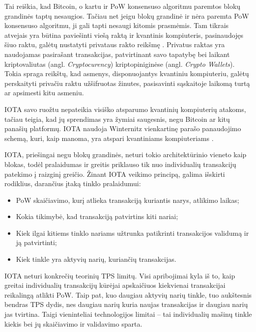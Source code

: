 Tai reiškia, kad Bitcoin, o kartu ir PoW konsensuso algoritmu paremtos blokų grandinės taptų nesaugios. Tačiau net jeigu blokų grandinė ir nėra paremta PoW konsensuso algoritmu, ji gali tapti nesaugi kitomis prasmėmis. Tam tikrais atvejais yra būtina paviešinti viešą raktą ir kvantinis kompiuteris, pasinaudojęs šiuo raktu, galėtų nustatyti privataus rakto reikšmę \cite{aggarwal2017quantum}. Privatus raktas yra naudojamas pasirašant transakcijas, patvirtinant savo tapatybę bei laikant kriptovaliutas (angl. \textit{Cryptocurency}) kriptopiniginėse (angl. \textit{Crypto Wallets}). Tokia spraga reikštų, kad asmenys, disponuojantys kvantiniu kompiuteriu, galėtų perskaityti privačiu raktu užšifruotas žinutes, pasisavinti sąskaitoje laikomą turtą ar apsimesti kitu asmeniu.

IOTA savo ruožtu nepateikia visiško atsparumo kvantinių kompiuterių atakoms, tačiau teigia, kad jų sprendimas yra žymiai saugesnis, negu Bitcoin ar kitų panašių platformų. IOTA naudoja Winternitz vienkartinę parašo panaudojimo schemą, kuri, kaip manoma, yra atspari kvantiniams kompiuteriams \cite{el2018review}.





IOTA, priešingai negu blokų grandinės, neturi tokio architektūrinio vieneto kaip blokas, todėl pralaidumas ir greitis priklauso tik nuo individualių transakcijų patekimo į raizginį greičio. Žinant IOTA veikimo principą, galima išskirti rodiklius, darančius įtaką tinklo pralaidumui:
\begin{itemize}
    \item PoW skaičiavimo, kurį atlieka transakciją kuriantis narys, atlikimo laikas;
    \item Kokia tikimybė, kad transakciją patvirtins kiti nariai;
    \item Kiek ilgai kitiems tinklo nariams užtrunka patikrinti transakcijos validumą ir ją patvirtinti;
    \item Kiek tinkle yra aktyvių narių, kuriančių transakcijas.
\end{itemize}

IOTA neturi konkrečių teorinių TPS limitų. Visi apribojimai kyla iš to, kaip greitai individualių transakcijų kūrėjai apskaičiuos kiekvienai transakcijai reikalingą atlikti PoW. Taip pat, kuo daugiau aktyvių narių tinkle, tuo aukštesnis bendras TPS dydis, nes daugiau narių kuria naujas transakcijas ir daugiau narių jas tvirtina. Taigi vieninteliai technologijos limitai – tai individualių mašinų tinkle kiekis bei jų skaičiavimo ir validavimo sparta.

